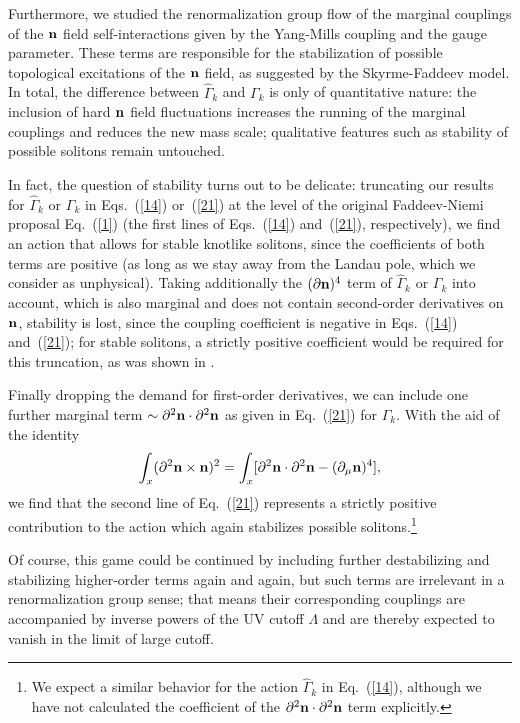 \documentclass[a4paper,12pt]{article}
\newcommand{\re}[1]{~(\ref{#1})}
\begin{document}
Furthermore, we studied the renormalization group flow of the marginal
couplings of the $\mathbf{n}$ field self-interactions given by the Yang-Mills
coupling and the gauge parameter. These terms are responsible for the
stabilization of possible topological excitations of the $\mathbf{n}$ field,
as suggested by the Skyrme-Faddeev model. In total, the difference
between $\hat{\Gamma}_k$ and $\Gamma_k$ is only of quantitative
nature: the inclusion of hard $\mathbf{n}$ field fluctuations increases the
running of the marginal couplings and reduces the new mass scale;
qualitative features such as stability of possible solitons remain
untouched. 

In fact, the question of stability turns out to be delicate:
truncating our results for $\hat{\Gamma}_k$ or $\Gamma_k$ in
Eqs.\re{14} or\re{21} at the level of the original Faddeev-Niemi
proposal Eq.\re{1} (the first lines of Eqs.\re{14} and\re{21},
respectively), we find an action that allows for stable knotlike
solitons, since the coefficients of both terms are positive (as long
as we stay away from the Landau pole, which we consider as unphysical).
Taking additionally the $(\partial\mathbf{n})^4$ term of $\hat{\Gamma}_k$ or
$\Gamma_k$ into account, which is also marginal and does not contain
second-order derivatives on $\mathbf{n}$, stability is lost, since the
coupling coefficient is negative in Eqs.\re{14} and\re{21}; for stable
solitons, a strictly positive coefficient would be required for this
truncation, as was shown in \cite{Gladikowski:1997mb}.

Finally dropping the demand for first-order derivatives, we can
include one further marginal term $\sim
\partial^2\mathbf{n}\cdot\partial^2\mathbf{n}$ as given in Eq.\re{21} for
$\Gamma_k$. With the aid of the identity
\begin{equation}
\int_x
(\partial^2\mathbf{n}\times\mathbf{n})^2=\int_x[\partial^2\mathbf{n}\cdot\partial^2\mathbf{n}
-(\partial_\mu\mathbf{n})^4], \label{22}
\end{equation}
we find that the second line of Eq.\re{21} represents a strictly
positive contribution to the action which again stabilizes possible
solitons.\footnote{We expect a similar behavior for the action
  $\hat{\Gamma}_k$ in Eq.\re{14}, although we have not calculated
  the coefficient of the $\partial^2\mathbf{n}\cdot\partial^2\mathbf{n}$ term
  explicitly.} 

Of course, this game could be continued by including further
destabilizing and stabilizing higher-order terms again and again, but
such terms are irrelevant in a renormalization group sense; that means
their corresponding couplings are accompanied by inverse powers of the
UV cutoff $\Lambda$ and are thereby expected to vanish in the limit of
large cutoff. 
\end{document}
